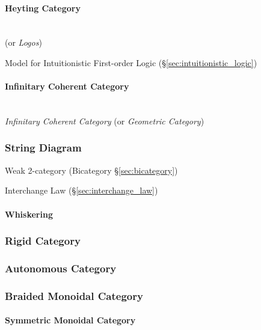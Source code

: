 \paragraph{Heyting Category}\label{sec:heyting_category}
\hfill \\

(or \emph{Logos})

Model for Intuitionistic First-order Logic
(\S\ref{sec:intuitionistic_logic})



\paragraph{Infinitary Coherent Category}
\label{sec:infinitary_coherent_category}
\hfill \\

\emph{Infinitary Coherent Category} (or \emph{Geometric Category})



\subsubsection{String Diagram}\label{sec:string_diagram}

Weak 2-category (Bicategory \S\ref{sec:bicategory})

Interchange Law (\S\ref{sec:interchange_law})



\paragraph{Whiskering}\label{sec:whiskering}



\subsubsection{Rigid Category}\label{sec:rigid_category}

\subsubsection{Autonomous Category}\label{sec:autonomous_category}

\subsubsection{Braided Monoidal Category}\label{sec:braided_monoidal}

\paragraph{Symmetric Monoidal Category}\label{sec:symmetric_monoidal}
\hfill \\

